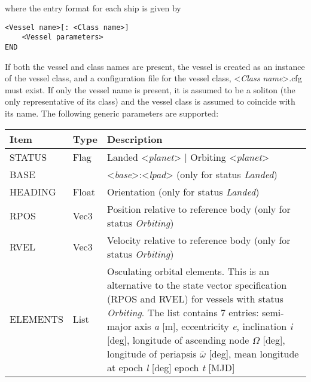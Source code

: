\documentclass[Orbiter Developer Manual.tex]{subfiles}
\begin{document}
\noindent
where the entry format for each ship is given by

\begin{lstlisting}[language=OSFS]
<Vessel name>[: <Class name>]
	<Vessel parameters>
END
\end{lstlisting}

\noindent
If both the vessel and class names are present, the vessel is created as an instance of the vessel class, and a configuration file for the vessel class, <\textit{Class name}>.cfg must exist. If only the vessel name is present, it is assumed to be a soliton (the only representative of its class) and the vessel class is assumed to coincide with its name.
The following generic parameters are supported:

	\begin{longtable}{ |p{}|p{}|p{}| }
	\hline\rule{0pt}{2ex}
	\textbf{Item} & \textbf{Type} & \textbf{Description}\\
	\hline\rule{0pt}{2ex}
	STATUS & Flag & Landed <\textit{planet}> | Orbiting <\textit{planet}>\\
	\hline\rule{0pt}{2ex}
	BASE &  & <\textit{base}>:<\textit{lpad}> (only for status \textit{Landed})\\
	\hline\rule{0pt}{2ex}
	HEADING & Float & Orientation (only for status \textit{Landed})\\
	\hline\rule{0pt}{2ex}
	RPOS & Vec3 & Position relative to reference body (only for status \textit{Orbiting})\\
	\hline\rule{0pt}{2ex}
	RVEL & Vec3 & Velocity relative to reference body (only for status \textit{Orbiting})\\
	\hline\rule{0pt}{2ex}
	ELEMENTS & List & Osculating orbital elements. This is an alternative to the state vector specification (RPOS and RVEL) for vessels with status \textit{Orbiting}. The list contains 7 entries:\newline
	semi-major axis \textit{a} [m],\newline
	eccentricity \textit{e},\newline
	inclination \textit{i} [deg],\newline
	longitude of ascending node $\Omega$ [deg],\newline
	longitude of periapsis $\overline{\omega}$ [deg],\newline
	mean longitude at epoch \textit{l} [deg]\newline
	epoch \textit{t} [MJD]\\

\end{longtable}
\end{document}
